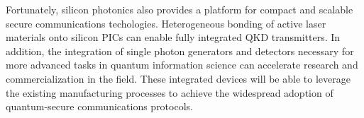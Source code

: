 \documentclass[letterpaper, 10 pt, conference]{ieeeconf}  %
\begin{document}
Fortunately, silicon photonics also provides a platform for compact and scalable secure communications techologies. Heterogeneous bonding of active laser materials onto silicon PICs can enable fully integrated QKD transmitters. In addition, the integration of single photon generators and detectors necessary for more advanced tasks in quantum information science can accelerate research and commercialization in the field. These integrated devices will be able to leverage the existing manufacturing processes to achieve the widespread adoption of quantum-secure communications protocols.



\end{document}
